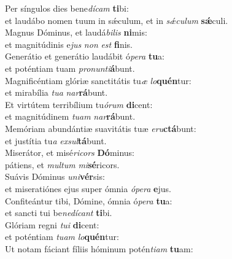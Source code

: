 \evenverse Per síngulos dies bene\textit{dí}\textit{cam} \textbf{ti}bi:~\*\\
\evenverse et laudábo nomen tuum in sǽculum, et in \textit{sǽ}\textit{cu}\textit{lum} \textbf{sǽ}culi.\\
\oddverse Magnus Dóminus, et laudá\textit{bi}\textit{lis} \textbf{ni}mis:~\*\\
\oddverse et magnitúdinis e\textit{jus} \textit{non} \textit{est} \textbf{fi}nis.\\
\evenverse Generátio et generátio laudábit ó\textit{pe}\textit{ra} \textbf{tu}a:~\*\\
\evenverse et poténtiam tuam \textit{pro}\textit{nun}\textit{ti}\textbf{á}bunt.\\
\oddverse Magnificéntiam glóriæ sanctitátis tu\textit{æ} \textit{lo}\textbf{quén}tur:~\*\\
\oddverse et mirabília \textit{tu}\textit{a} \textit{nar}\textbf{rá}bunt.\\
\evenverse Et virtútem terribílium tu\textit{ó}\textit{rum} \textbf{di}cent:~\*\\
\evenverse et magnitúdinem \textit{tu}\textit{am} \textit{nar}\textbf{rá}bunt.\\
\oddverse Memóriam abundántiæ suavitátis tuæ \textit{e}\textit{ru}\textbf{ctá}bunt:~\*\\
\oddverse et justítia tu\textit{a} \textit{ex}\textit{sul}\textbf{tá}bunt.\\
\evenverse Miserátor, et misé\textit{ri}\textit{cors} \textbf{Dó}minus:~\*\\
\evenverse pátiens, et \textit{mul}\textit{tum} \textit{mi}\textbf{sé}ricors.\\
\oddverse Suávis Dóminus \textit{u}\textit{ni}\textbf{vér}sis:~\*\\
\oddverse et miseratiónes ejus super ómnia \textit{ó}\textit{pe}\textit{ra} \textbf{e}jus.\\
\evenverse Confiteántur tibi, Dómine, ómnia ó\textit{pe}\textit{ra} \textbf{tu}a:~\*\\
\evenverse et sancti tui be\textit{ne}\textit{dí}\textit{cant} \textbf{ti}bi.\\
\oddverse Glóriam regni \textit{tu}\textit{i} \textbf{di}cent:~\*\\
\oddverse et poténtiam \textit{tu}\textit{am} \textit{lo}\textbf{quén}tur:\\
\evenverse Ut notam fáciant fíliis hóminum potén\textit{ti}\textit{am} \textbf{tu}am:~\*\\
